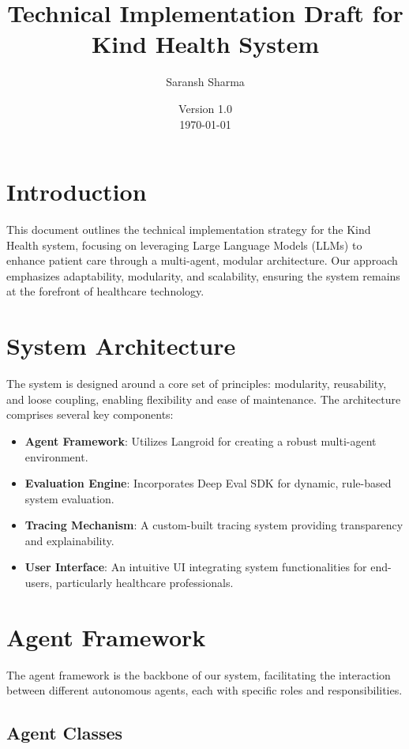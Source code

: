\documentclass{article}
\title{Technical Implementation Draft for Kind Health System}
\author{Saransh Sharma}
\date{Version 1.0 \\ \today}
\begin{document}
\maketitle

\section{Introduction}

This document outlines the technical implementation strategy for the Kind Health system, focusing on leveraging Large Language Models (LLMs) to enhance patient care through a multi-agent, modular architecture. Our approach emphasizes adaptability, modularity, and scalability, ensuring the system remains at the forefront of healthcare technology.

\section{System Architecture}

The system is designed around a core set of principles: modularity, reusability, and loose coupling, enabling flexibility and ease of maintenance. The architecture comprises several key components:

\begin{itemize}
    \item \textbf{Agent Framework}: Utilizes Langroid for creating a robust multi-agent environment.
    \item \textbf{Evaluation Engine}: Incorporates Deep Eval SDK for dynamic, rule-based system evaluation.
    \item \textbf{Tracing Mechanism}: A custom-built tracing system providing transparency and explainability.
    \item \textbf{User Interface}: An intuitive UI integrating system functionalities for end-users, particularly healthcare professionals.
\end{itemize}

\section{Agent Framework}

The agent framework is the backbone of our system, facilitating the interaction between different autonomous agents, each with specific roles and responsibilities.

\subsection{Agent Classes}
\end{document}
